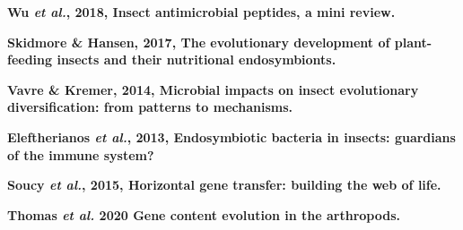 \documentclass[11pt]{article}
\begin{document}
\begin{sloppypar}
\par
\textbf{Wu \textit{et al.}, 2018, Insect antimicrobial peptides, a mini review.} \newline
\par
\textbf{Skidmore & Hansen, 2017, The evolutionary development of plant-feeding insects and their nutritional endosymbionts.} \newline
\par
\textbf{Vavre & Kremer, 2014, Microbial impacts on insect evolutionary diversification: from patterns to mechanisms.} \newline
\par
\textbf{Eleftherianos \textit{et al.}, 2013, Endosymbiotic bacteria in insects: guardians of the immune system?}
\par
\textbf{Soucy \textit{et al.}, 2015, Horizontal gene transfer: building the web of life.}
\par
\textbf{Thomas \textit{et al.} 2020 Gene content evolution in the arthropods.} \newline

\end{sloppypar}
\end{document}
